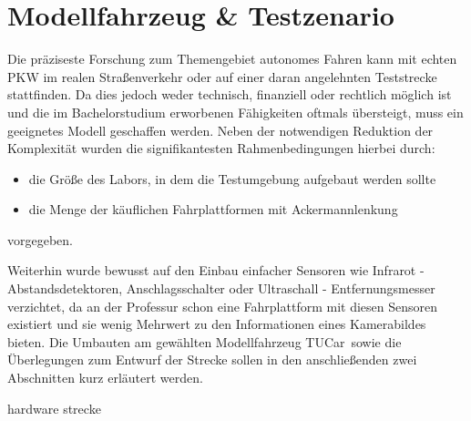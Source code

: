 \chapter{Modellfahrzeug \& Testzenario \dcsecondauthorshort}
\label{cha:fahrzeug_szenario}

Die präziseste Forschung zum Themengebiet autonomes Fahren kann mit echten PKW im realen Straßenverkehr oder auf einer daran angelehnten Teststrecke stattfinden. Da dies jedoch weder technisch, finanziell oder rechtlich möglich ist und die im Bachelorstudium erworbenen Fähigkeiten oftmals übersteigt, muss ein geeignetes Modell geschaffen werden. Neben der notwendigen Reduktion der Komplexität wurden die signifikantesten Rahmenbedingungen hierbei durch:
\begin{itemize}
\item die Größe des Labors, in dem die Testumgebung aufgebaut werden sollte
\item die Menge der käuflichen Fahrplattformen mit Ackermannlenkung
\end{itemize}
vorgegeben. 

Weiterhin wurde bewusst auf den Einbau \glqq einfacher\grqq{} Sensoren wie Infrarot - Abstandsdetektoren, Anschlagsschalter oder Ultraschall - Entfernungsmesser verzichtet, da an der Professur schon eine Fahrplattform mit diesen Sensoren existiert und sie wenig Mehrwert zu den Informationen eines Kamerabildes bieten. Die Umbauten am gewählten Modellfahrzeug \glqq TUCar\grqq\ sowie die Überlegungen zum Entwurf der Strecke sollen in den anschließenden zwei Abschnitten kurz erläutert werden.

{hardware}
{strecke}
